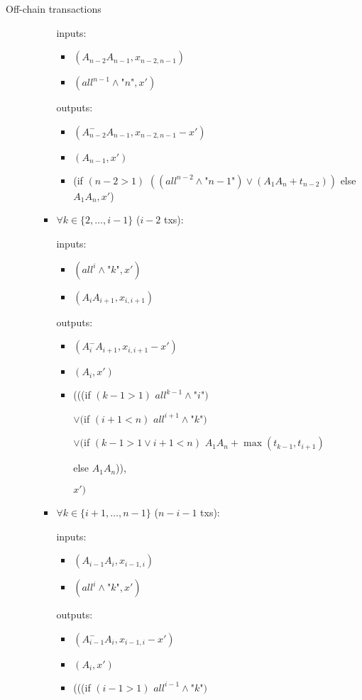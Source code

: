 \begin{notitlebox}{Off-chain transactions}
\begin{itemize}
\begin{itemize}
\begin{itemize}
        inputs:
        \begin{itemize}
          \item $(A_{n-2} A_{n-1}, x_{n-2,n-1})$
          \item $(\mathit{all}^{n-1} \wedge \texttt{"}n\texttt{"}, x')$
        \end{itemize}
        outputs:
        \begin{itemize}
          \item $(A_{n-2}^- A_{n-1}, x_{n-2,n-1} - x')$
          \item $(A_{n-1}, x')$
          \item (if $(n-2 > 1)$ $((\mathit{all}^{n-2} \wedge
          \texttt{"}n-1\texttt{"})
          \vee (A_1 A_n + t_{n-2}))$ else $A_1 A_n, x'$)
        \end{itemize}
        \item $\forall k \in \{2, \dots, i-1\}$ ($i-2$ txs):

        inputs:
        \begin{itemize}
          \item $(\mathit{all}^i \wedge \texttt{"}k\texttt{"}, x')$
          \item $(A_i A_{i+1}, x_{i,i+1})$
        \end{itemize}
        outputs:
        \begin{itemize}
          \item $(A_i^- A_{i+1}, x_{i,i+1} - x')$
          \item $(A_i, x')$
          \item (((if $(k-1 > 1)$ $\mathit{all}^{k-1} \wedge
          \texttt{"}i\texttt{"})$

          $\vee ($if $(i+1 < n)$ $\mathit{all}^{i+1} \wedge
          \texttt{"}k\texttt{"})$

          $\vee ($if $(k-1 > 1 \vee i+1 < n)$ $A_1 A_n+\max{(t_{k-1}, t_{i+1})}$

          \:\:\: else $A_1 A_n$)),

          $x')$
        \end{itemize}
        \item $\forall k \in \{i+1, \dots, n-1\}$ ($n-i-1$ txs):

        inputs:
        \begin{itemize}
          \item $(A_{i-1} A_i, x_{i-1,i})$
          \item $(\mathit{all}^i \wedge \texttt{"}k\texttt{"}, x')$
        \end{itemize}
        outputs:
        \begin{itemize}
          \item $(A_{i-1}^- A_i, x_{i-1,i} - x')$
          \item $(A_i, x')$
          \item (((if $(i-1 > 1)$ $\mathit{all}^{i-1} \wedge \texttt{"}k\texttt{"})$


\end{itemize}
\end{itemize}
\end{itemize}
\end{itemize}
\end{notitlebox}
